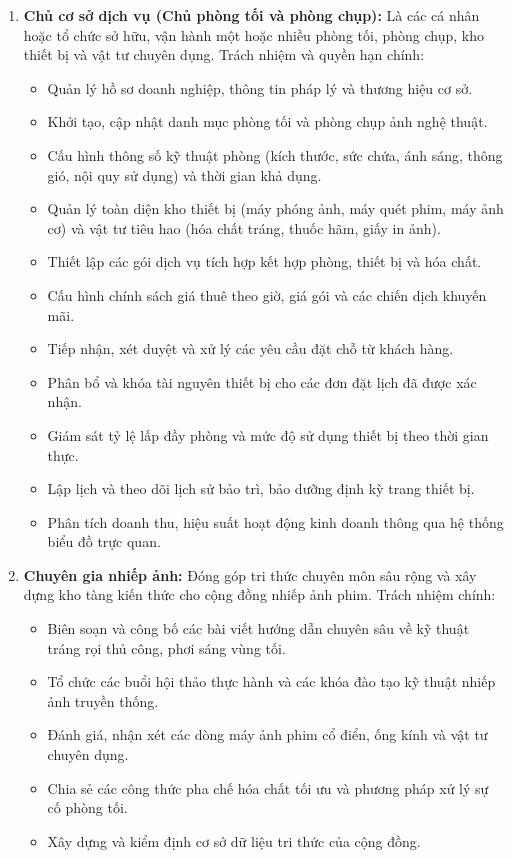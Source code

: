 \begin{enumerate}[leftmargin=2em]
    \item \textbf{Chủ cơ sở dịch vụ (Chủ phòng tối và phòng chụp):}
    Là các cá nhân hoặc tổ chức sở hữu, vận hành một hoặc nhiều phòng tối, phòng chụp, kho thiết bị và vật tư chuyên dụng. Trách nhiệm và quyền hạn chính:
    \begin{itemize}
        \item Quản lý hồ sơ doanh nghiệp, thông tin pháp lý và thương hiệu cơ sở.
        \item Khởi tạo, cập nhật danh mục phòng tối và phòng chụp ảnh nghệ thuật.
        \item Cấu hình thông số kỹ thuật phòng (kích thước, sức chứa, ánh sáng, thông gió, nội quy sử dụng) và thời gian khả dụng.
        \item Quản lý toàn diện kho thiết bị (máy phóng ảnh, máy quét phim, máy ảnh cơ) và vật tư tiêu hao (hóa chất tráng, thuốc hãm, giấy in ảnh).
        \item Thiết lập các gói dịch vụ tích hợp kết hợp phòng, thiết bị và hóa chất.
        \item Cấu hình chính sách giá thuê theo giờ, giá gói và các chiến dịch khuyến mãi.
        \item Tiếp nhận, xét duyệt và xử lý các yêu cầu đặt chỗ từ khách hàng.
        \item Phân bổ và khóa tài nguyên thiết bị cho các đơn đặt lịch đã được xác nhận.
        \item Giám sát tỷ lệ lấp đầy phòng và mức độ sử dụng thiết bị theo thời gian thực.
        \item Lập lịch và theo dõi lịch sử bảo trì, bảo dưỡng định kỳ trang thiết bị.
        \item Phân tích doanh thu, hiệu suất hoạt động kinh doanh thông qua hệ thống biểu đồ trực quan.
    \end{itemize}

    \item \textbf{Chuyên gia nhiếp ảnh:}
    Đóng góp tri thức chuyên môn sâu rộng và xây dựng kho tàng kiến thức cho cộng đồng nhiếp ảnh phim. Trách nhiệm chính:
    \begin{itemize}
        \item Biên soạn và công bố các bài viết hướng dẫn chuyên sâu về kỹ thuật tráng rọi thủ công, phơi sáng vùng tối.
        \item Tổ chức các buổi hội thảo thực hành và các khóa đào tạo kỹ thuật nhiếp ảnh truyền thống.
        \item Đánh giá, nhận xét các dòng máy ảnh phim cổ điển, ống kính và vật tư chuyên dụng.
        \item Chia sẻ các công thức pha chế hóa chất tối ưu và phương pháp xử lý sự cố phòng tối.
        \item Xây dựng và kiểm định cơ sở dữ liệu tri thức của cộng đồng.
    \end{itemize}


\end{enumerate}
